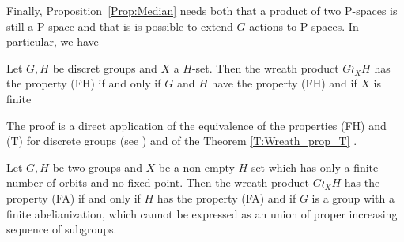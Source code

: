 Finally, Proposition~\ref{Prop:Median} needs both that a product of two P-spaces is still a P-space and that is is possible to extend $G$ actions to P-spaces.
In particular, we have
\begin{prop}
Let $G,H$ be discret groups and $X$ a $H$-set. Then the wreath product $G \wr_X H$ has the property (FH) if and only if $G$ and $H$ have the property (FH) and if $X$ is finite
\end{prop}
The proof is a direct application of the equivalence of the properties (FH) and (T) for discrete groups (see \cite{Bekka2008}) and of the Theorem \ref{T:Wreath_prop_T} .
%
\begin{thm}
Let $G,H$ be two groups and $X$ be a non-empty $H$ set which has only a finite number of orbits and no fixed point. Then the wreath product $G \wr_X H$ has the property (FA) if and only if $H$ has the property (FA) and if $G$ is a group with a finite abelianization, which cannot be expressed as an union of proper increasing sequence of subgroups.
\end{thm}

